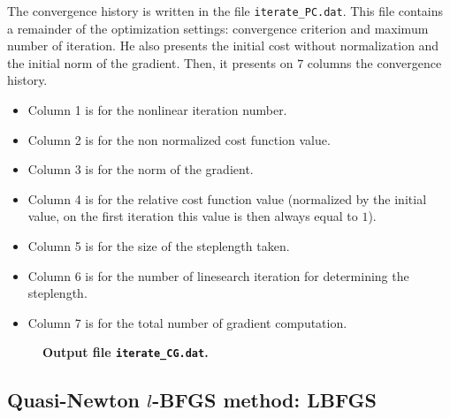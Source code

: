 \documentclass[a4paper,twoside,final,onecolumn,11pt,openright]{article}
\begin{document}
The convergence history is written in the file \texttt{iterate\_PC.dat}. This file contains a remainder of the optimization settings: convergence criterion and maximum number of iteration. He also presents the initial cost without normalization and the initial norm of the gradient. Then, it presents on $7$ columns the convergence history. 
\begin{itemize}
\item Column 1 is for the nonlinear iteration number.
\item Column 2 is for the non normalized cost function value.
\item Column 3 is for the norm of the gradient.
\item Column 4 is for the relative cost function value (normalized by the initial value, on the first iteration this value is then always equal to $1$).
\item Column 5 is for the size of the steplength taken.
\item Column 6 is for the number of linesearch iteration for determining the steplength.
\item Column 7 is for the total number of gradient computation.
\end{itemize}

\begin{figure}
\tiny
 
\normalsize
\begin{center}
\textbf{Output file \texttt{iterate\_CG.dat}.} 
\end{center} 
\end{figure}






\newpage 
\subsection{Quasi-Newton $l$-BFGS method: LBFGS}
\end{document}
